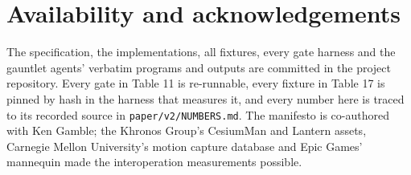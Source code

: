 \documentclass[10pt,twocolumn,letterpaper]{article}
\newcommand{\code}[1]{\texttt{\small #1}}
\begin{document}
\section*{Availability and acknowledgements}

The specification, the implementations, all fixtures, every gate harness and the gauntlet agents' verbatim programs and outputs are committed in the project repository. Every gate in Table 11 is re-runnable, every fixture in Table 17 is pinned by hash in the harness that measures it, and every number here is traced to its recorded source in \code{paper/v2/NUMBERS.md}. The manifesto is co-authored with Ken Gamble; the Khronos Group's CesiumMan and Lantern assets, Carnegie Mellon University's motion capture database and Epic Games' mannequin made the interoperation measurements possible.
\end{document}
